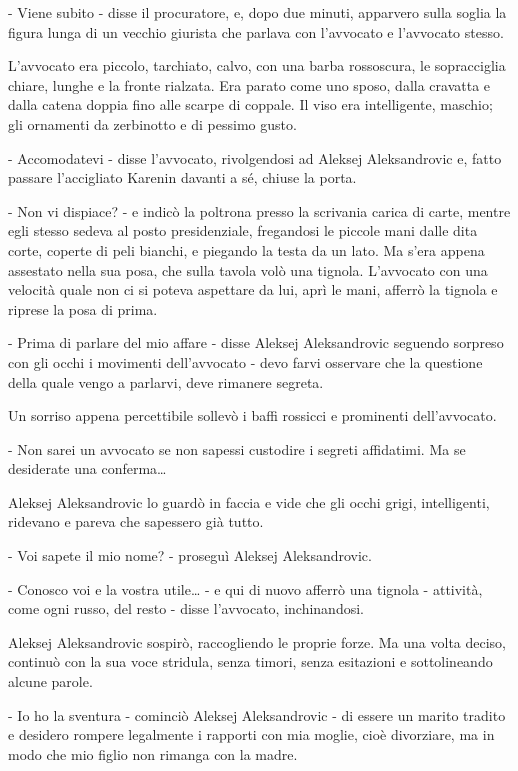 - Viene subito - disse il procuratore, e, dopo due minuti, apparvero sulla soglia la figura lunga di un vecchio giurista che parlava con l'avvocato e l'avvocato stesso. 

L'avvocato era piccolo, tarchiato, calvo, con una barba rossoscura, le sopracciglia chiare, lunghe e la fronte rialzata. Era parato come uno sposo, dalla cravatta e dalla catena doppia fino alle scarpe di coppale. Il viso era intelligente, maschio; gli ornamenti da zerbinotto e di pessimo gusto. 

- Accomodatevi - disse l'avvocato, rivolgendosi ad Aleksej Aleksandrovic e, fatto passare l'accigliato Karenin davanti a sé, chiuse la porta. 

- Non vi dispiace? - e indicò la poltrona presso la scrivania carica di carte, mentre egli stesso sedeva al posto presidenziale, fregandosi le piccole mani dalle dita corte, coperte di peli bianchi, e piegando la testa da un lato. Ma s'era appena assestato nella sua posa, che sulla tavola volò una tignola. L'avvocato con una velocità quale non ci si poteva aspettare da lui, aprì le mani, afferrò la tignola e riprese la posa di prima. 

- Prima di parlare del mio affare - disse Aleksej Aleksandrovic seguendo sorpreso con gli occhi i movimenti dell'avvocato - devo farvi osservare che la questione della quale vengo a parlarvi, deve rimanere segreta. 

Un sorriso appena percettibile sollevò i baffi rossicci e prominenti dell'avvocato. 

- Non sarei un avvocato se non sapessi custodire i segreti affidatimi. Ma se desiderate una conferma\ldots{} 

Aleksej Aleksandrovic lo guardò in faccia e vide che gli occhi grigi, intelligenti, ridevano e pareva che sapessero già tutto. 

- Voi sapete il mio nome? - proseguì Aleksej Aleksandrovic. 

- Conosco voi e la vostra utile\ldots{} - e qui di nuovo afferrò una tignola - attività, come ogni russo, del resto - disse l'avvocato, inchinandosi. 

Aleksej Aleksandrovic sospirò, raccogliendo le proprie forze. Ma una volta deciso, continuò con la sua voce stridula, senza timori, senza esitazioni e sottolineando alcune parole. 

- Io ho la sventura - cominciò Aleksej Aleksandrovic - di essere un marito tradito e desidero rompere legalmente i rapporti con mia moglie, cioè divorziare, ma in modo che mio figlio non rimanga con la madre. 

